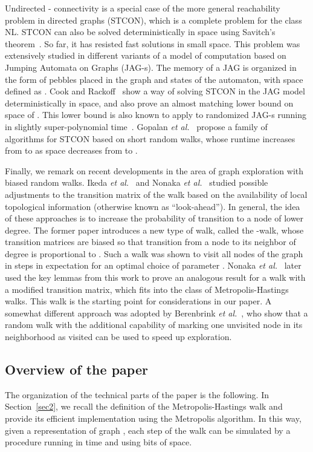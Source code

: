 \documentclass[11pt,a4paper]{article}
\newcommand{\etal}{\textsl{et al.}\xspace}
\renewcommand{\*}{\hspace*{5mm}}
\begin{document}
Undirected - connectivity is a special case of the more general reachability problem in directed graphs (STCON), which is a complete problem for the class NL. STCON can also be solved deterministically in  space using Savitch's theorem~\cite{Sav}. So far, it has resisted fast solutions in small space. This problem was extensively studied in different variants of a model of computation based on Jumping Automata on Graphs (JAG-s). The memory of a JAG is organized in the form of  pebbles placed in the graph and  states of the automaton, with space defined as . Cook and Rackoff~\cite{CR} show a way of solving STCON in the JAG model deterministically in  space, and also prove an almost matching lower bound on space of . This lower bound is also known to apply to randomized JAG-s running in slightly super-polynomial time~\cite{BS}. Gopalan \etal~\cite{GLM} propose a family of algorithms for STCON based on short random walks, whose runtime increases from  to  as space decreases from  to .

Finally, we remark on recent developments in the area of graph exploration with biased random walks. Ikeda \etal~\cite{IKY} and Nonaka \etal~\cite{NOSY} studied possible adjustments to the transition matrix of the walk based on the availability of local topological information (otherwise known as ``look-ahead''). In general, the idea of these approaches is to increase the probability of transition to a node of lower degree. The former paper introduces a new type of walk, called the -walk, whose transition matrices are biased so that transition from a node to its neighbor of degree  is proportional to . Such a walk was shown to visit all nodes of the graph in  steps in expectation for an optimal choice of parameter . Nonaka \etal~\cite{NOSY} later used the key lemmas from this work to prove an analogous result for a walk with a modified transition matrix, which fits into the class of Metropolis-Hastings walks. This walk is the starting point for considerations in our paper. A somewhat different approach was adopted by Berenbrink \etal~\cite{BCERS}, who show that a random walk with the additional capability of marking one unvisited node in its neighborhood as visited can be used to speed up exploration.

\subsection{Overview of the paper}

The organization of the technical parts of the paper is the following. In Section~\ref{sec2}, we recall the definition of the Metropolis-Hastings walk and provide its efficient implementation using the Metropolis algorithm. In this way, given a representation of graph , each step of the walk can be simulated by a procedure running in  time and using  bits of space.
\end{document}
